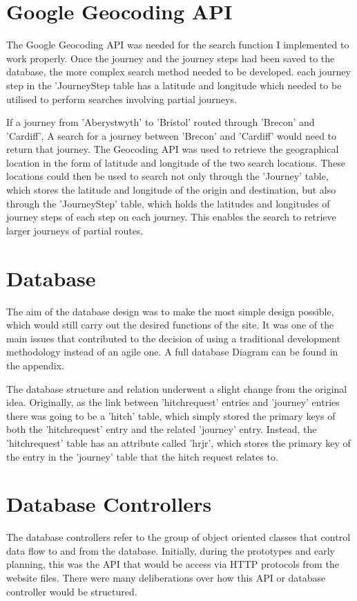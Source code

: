 \section{Google Geocoding API}
	The Google Geocoding API\cite{google_geocoding_api} was needed for the search function I implemented to work properly. Once the journey and the journey steps had been saved to the database, the more complex search method needed to be developed. each journey step in the 'Journey\textunderscore Step table has a latitude and longitude which needed to be utilised to perform searches involving partial journeys. 
	
	If a journey from 'Aberystwyth' to 'Bristol' routed through 'Brecon' and 'Cardiff', A search for a journey between 'Brecon' and 'Cardiff' would need to return that journey. The Geocoding API was used to retrieve the geographical location in the form of latitude and longitude of the two search locations. These locations could then be used to search not only through the 'Journey' table, which stores the latitude and longitude of the origin and destination, but also through the 'Journey\textunderscore Step' table, which holds the latitudes and longitudes of journey steps of each step on each journey. This enables the search to retrieve larger journeys of partial routes.
	
\section{Database}	

The aim of the database design was to make the most simple design possible, which would still carry out the desired functions of the site. It was one of the main issues that contributed to the decision of using a traditional development methodology instead of an agile one. A full database Diagram can be found in the appendix.

The database structure and relation underwent a slight change from the original idea. Originally, as the link between 'hitch\textunderscore request' entries and 'journey' entries there was going to be a 'hitch' table, which simply stored the primary keys of both the 'hitch\textunderscore request' entry and the related 'journey' entry. Instead, the 'hitch\textunderscore request' table has an attribute called 'hr\textunderscore jr', which stores the primary key of the entry in the 'journey' table that the hitch request relates to.
	
\section{Database Controllers}
	The database controllers refer to the group of object oriented classes that control data flow to and from the database. Initially, during the prototypes and early planning, this was the API that would be access via HTTP protocols from the website files. There were many deliberations over how this API or database controller would be structured.
	

